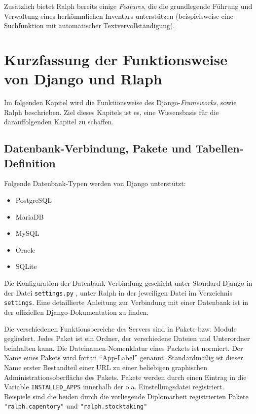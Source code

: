 Zusätzlich bietet Ralph bereits einige
\emph{Features},
die die grundlegende Führung und Verwaltung eines herkömmlichen
Inventars unterstützen (beispielsweise eine Suchfunktion mit
automatischer Textvervollständigung).

\hypertarget{kurzfassung-der-funktionsweise-von-django-und-rlaph}{%
\section{Kurzfassung der Funktionsweise von Django und
Rlaph}\label{kurzfassung-der-funktionsweise-von-django-und-rlaph}}

Im folgenden Kapitel wird die Funktionsweise des
Django-\emph{Frameworks},
sowie Ralph beschrieben. Ziel dieses Kapitels ist es, eine Wissensbasis
für die darauffolgenden Kapitel zu schaffen.

\hypertarget{datenbank-verbindung-pakete-und-tabellen-definition}{%
\subsection{Datenbank-Verbindung, Pakete und
Tabellen-Definition}\label{datenbank-verbindung-pakete-und-tabellen-definition}}

Folgende Datenbank-Typen werden von Django unterstützt:

\begin{itemize}
\tightlist
\item
  PostgreSQL
\item
  MariaDB
\item
  MySQL
\item
  Oracle
\item
  SQLite
\end{itemize}

Die Konfiguration der Datenbank-Verbindung geschieht unter
Standard-Django in der Datei \texttt{settings.py} , unter Ralph in der
jeweiligen Datei im Verzeichnis \texttt{settings}. Eine detaillierte
Anleitung zur Verbindung mit einer Datenbank ist in der offiziellen
Django-Dokumentation \cite{django-doku-db} zu finden.

Die verschiedenen Funktionsbereiche des Servers sind in Pakete bzw.
Module gegliedert. Jedes Paket ist ein Ordner, der verschiedene Dateien
und Unterordner beinhalten kann. Die Dateinamen-Nomenklatur eines
Packets ist normiert.\cite{django-file-nomenklatur} Der Name eines
Pakets wird fortan ``App-Label'' genannt. Standardmäßig ist dieser Name
erster Bestandteil einer URL zu einer beliebigen graphischen
Administrationsoberfläche des Pakets. Pakete werden durch einen Eintrag
in die Variable \texttt{INSTALLED\_APPS} innerhalb der o.a.
Einstellungsdatei registriert. Beispiele sind die beiden durch die
vorliegende Diplomarbeit registrierten Pakete \texttt{"ralph.capentory"}
und \texttt{"ralph.stocktaking"}

